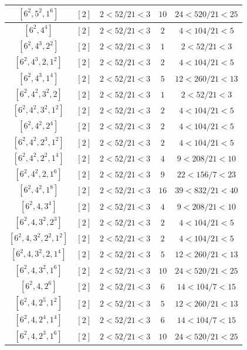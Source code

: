 \documentclass{article}%
\begin{document}
\begin{center}
\begin{longtable}{||c|c|c|c|c||}
$[6^{2}, 5^{2}, 1^{6}]$ & $[2]$ & $2 < 52/21 < 3$ & $10$ & $24 < 520/21 < 25$ \\ \hline 
$[6^{2}, 4^{4}]$ & $[2]$ & $2 < 52/21 < 3$ & $2$ & $4 < 104/21 < 5$ \\ \hline 
$[6^{2}, 4^{3}, 2^{2}]$ & $[2]$ & $2 < 52/21 < 3$ & $1$ & $2 < 52/21 < 3$ \\ \hline 
$[6^{2}, 4^{3}, 2, 1^{2}]$ & $[2]$ & $2 < 52/21 < 3$ & $2$ & $4 < 104/21 < 5$ \\ \hline 
$[6^{2}, 4^{3}, 1^{4}]$ & $[2]$ & $2 < 52/21 < 3$ & $5$ & $12 < 260/21 < 13$ \\ \hline 
$[6^{2}, 4^{2}, 3^{2}, 2]$ & $[2]$ & $2 < 52/21 < 3$ & $1$ & $2 < 52/21 < 3$ \\ \hline 
$[6^{2}, 4^{2}, 3^{2}, 1^{2}]$ & $[2]$ & $2 < 52/21 < 3$ & $2$ & $4 < 104/21 < 5$ \\ \hline 
$[6^{2}, 4^{2}, 2^{4}]$ & $[2]$ & $2 < 52/21 < 3$ & $2$ & $4 < 104/21 < 5$ \\ \hline 
$[6^{2}, 4^{2}, 2^{3}, 1^{2}]$ & $[2]$ & $2 < 52/21 < 3$ & $2$ & $4 < 104/21 < 5$ \\ \hline 
$[6^{2}, 4^{2}, 2^{2}, 1^{4}]$ & $[2]$ & $2 < 52/21 < 3$ & $4$ & $9 < 208/21 < 10$ \\ \hline 
$[6^{2}, 4^{2}, 2, 1^{6}]$ & $[2]$ & $2 < 52/21 < 3$ & $9$ & $22 < 156/7 < 23$ \\ \hline 
$[6^{2}, 4^{2}, 1^{8}]$ & $[2]$ & $2 < 52/21 < 3$ & $16$ & $39 < 832/21 < 40$ \\ \hline 
$[6^{2}, 4, 3^{4}]$ & $[2]$ & $2 < 52/21 < 3$ & $4$ & $9 < 208/21 < 10$ \\ \hline 
$[6^{2}, 4, 3^{2}, 2^{3}]$ & $[2]$ & $2 < 52/21 < 3$ & $2$ & $4 < 104/21 < 5$ \\ \hline 
$[6^{2}, 4, 3^{2}, 2^{2}, 1^{2}]$ & $[2]$ & $2 < 52/21 < 3$ & $2$ & $4 < 104/21 < 5$ \\ \hline 
$[6^{2}, 4, 3^{2}, 2, 1^{4}]$ & $[2]$ & $2 < 52/21 < 3$ & $5$ & $12 < 260/21 < 13$ \\ \hline 
$[6^{2}, 4, 3^{2}, 1^{6}]$ & $[2]$ & $2 < 52/21 < 3$ & $10$ & $24 < 520/21 < 25$ \\ \hline 
$[6^{2}, 4, 2^{6}]$ & $[2]$ & $2 < 52/21 < 3$ & $6$ & $14 < 104/7 < 15$ \\ \hline 
$[6^{2}, 4, 2^{5}, 1^{2}]$ & $[2]$ & $2 < 52/21 < 3$ & $5$ & $12 < 260/21 < 13$ \\ \hline 
$[6^{2}, 4, 2^{4}, 1^{4}]$ & $[2]$ & $2 < 52/21 < 3$ & $6$ & $14 < 104/7 < 15$ \\ \hline 
$[6^{2}, 4, 2^{3}, 1^{6}]$ & $[2]$ & $2 < 52/21 < 3$ & $10$ & $24 < 520/21 < 25$ \\ \hline 

\end{longtable}
\end{center}
\end{document}
